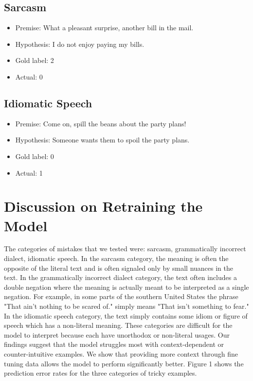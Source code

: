 \documentclass{article}
\begin{document}
\subsection{Sarcasm}
\begin{itemize}
	\item Premise: What a pleasant surprise, another bill in the mail.
	\item Hypothesis: I do not enjoy paying my bills.
	\item Gold label: 2
	\item Actual: 0
\end{itemize}

\subsection{Idiomatic Speech}
\begin{itemize}
	\item Premise: Come on, spill the beans about the party plans!
	\item Hypothesis: Someone wants them to spoil the party plans.
	\item Gold label: 0
	\item Actual: 1
\end{itemize}

\section{Discussion on Retraining the Model}
The categories of mistakes that we tested were:  sarcasm, grammatically incorrect dialect, idiomatic speech. In the sarcasm
category, the meaning is often the opposite of the literal text and is often signaled only by small nuances in the text.
In the grammatically incorrect dialect category, the text often includes a double negation where the meaning is actually meant
to be interpreted as a single negation. For example, in some parts of the southern United States the phrase
"That ain't nothing to be scared of." simply means "That isn't something to fear." In the idiomatic speech category,
the text simply contains some idiom or figure of speech which has a non-literal meaning. These categories are difficult
for the model to interpret because each have unorthodox or non-literal usages. Our findings suggest that the model
struggles most with context-dependent or counter-intuitive examples. We show that providing more context through fine tuning
data allows the model to perform significantly better. Figure 1 shows the prediction error rates for the three categories of
tricky examples.
\end{document}
